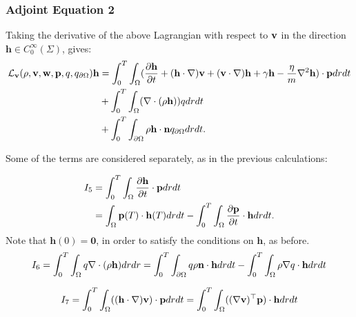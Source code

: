 \subsubsection{Adjoint Equation 2}

Taking the derivative of the above Lagrangian with respect to $\mathbf{v}$ in the direction $\mathbf{h} \in C_0^\infty(\Sigma)$, gives:
\begin{align*}
\mathcal{L}_{\mathbf{v}}(\rho,\mathbf{v},\mathbf{w},\mathbf{p},q,{q}_{\partial \Omega})\mathbf{h} &=  \int_0^T \int_\Omega ( \frac{\partial \mathbf{h} }{\partial t} +  (\mathbf{h} \cdot \nabla)\mathbf{v} +  (\mathbf{v} \cdot \nabla)\mathbf{h} +  \gamma \mathbf{h} - \frac{\eta}{m}\nabla^2 \mathbf{h}) \cdot \mathbf{p} dr dt\\
& + \int_0^T \int_\Omega ( \nabla \cdot (\rho \mathbf{h})) q dr dt\\ 
& +\int_0^T \int_{\partial\Omega} \rho \mathbf{h} \cdot \mathbf{n} {q}_{\partial \Omega} dr dt.
\end{align*}

Some of the terms are considered separately, as in the previous calculations:

\begin{align*}
I_5 &= \int_0^T \int_\Omega  \frac{\partial \mathbf{h} }{\partial t} \cdot \mathbf{p} dr dt \\
&= \int_\Omega \mathbf{p}(T) \cdot \mathbf{h}(T) dr dt  - \int_0^T \int_\Omega \frac{\partial \mathbf{p}}{\partial t} \cdot \mathbf{h} dr dt.
\end{align*}
Note that $\mathbf{h}(0)=\mathbf{0}$, in order to satisfy the conditions on $\mathbf{h}$, as before.
\begin{align*}
I_6= \int_0^T \int_\Omega q\nabla \cdot ( \rho \mathbf{h}) dr dr = \int_0^T \int_{\partial \Omega} q \rho  \mathbf{n}\cdot \mathbf{h} dr dt - \int_0^T \int_\Omega \rho\nabla q \cdot  \mathbf{h} dr dt
\end{align*}

\begin{align*}
I_7 = \int_0^T \int_\Omega  ((\mathbf{h} \cdot \nabla)\mathbf{v} ) \cdot\mathbf{p} dr dt = \int_0^T \int_\Omega  ((\nabla \mathbf{v})^\top\mathbf{p}) \cdot  \mathbf{h} dr dt
\end{align*}

